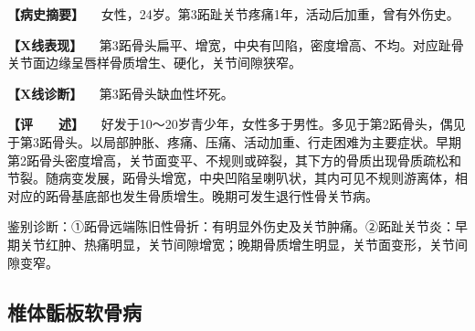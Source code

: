 \textbf{【病史摘要】}
　女性，24岁。第3跖趾关节疼痛1年，活动后加重，曾有外伤史。

\textbf{【X线表现】}
　第3跖骨头扁平、增宽，中央有凹陷，密度增高、不均。对应趾骨关节面边缘呈唇样骨质增生、硬化，关节间隙狭窄。

\textbf{【X线诊断】} 　第3跖骨头缺血性坏死。

\textbf{【评　　述】}
　好发于10～20岁青少年，女性多于男性。多见于第2跖骨头，偶见于第3跖骨头。以局部肿胀、疼痛、压痛、活动加重、行走困难为主要症状。早期第2跖骨头密度增高，关节面变平、不规则或碎裂，其下方的骨质出现骨质疏松和节裂。随病变发展，跖骨头增宽，中央凹陷呈喇叭状，其内可见不规则游离体，相对应的跖骨基底部也发生骨质增生。晚期可发生退行性骨关节病。

鉴别诊断：①跖骨远端陈旧性骨折：有明显外伤史及关节肿痛。②跖趾关节炎：早期关节红肿、热痛明显，关节间隙增宽；晚期骨质增生明显，关节面变形，关节间隙变窄。

\subsection{椎体骺板软骨病}

